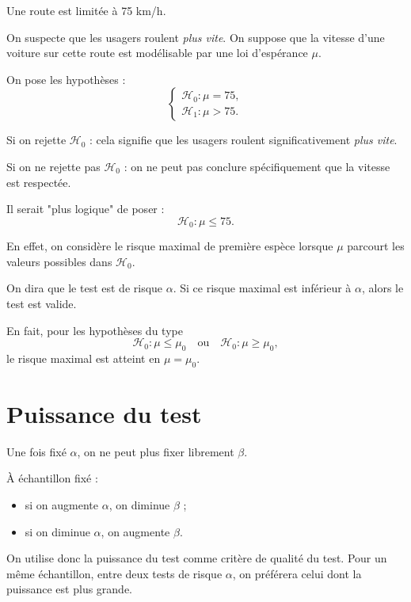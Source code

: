 \begin{exemple}
Une route est limitée à 75 km/h.  

On suspecte que les usagers roulent \textit{plus vite}.  
On suppose que la vitesse d'une voiture sur cette route est modélisable par une loi d'espérance $\mu$.

On pose les hypothèses :
\[
\begin{cases}
\mathcal{H}_0 : \mu = 75, \\
\mathcal{H}_1 : \mu > 75.
\end{cases}
\]

Si on rejette $\mathcal{H}_0$ : cela signifie que les usagers roulent significativement \textit{plus vite}.  

Si on ne rejette pas $\mathcal{H}_0$ : on ne peut pas conclure spécifiquement que la vitesse est respectée.
\end{exemple}

\begin{remarque}
Il serait "plus logique" de poser :
\[
\mathcal{H}_0 : \mu \leq 75.
\]

En effet, on considère le risque maximal de première espèce lorsque $\mu$ parcourt les valeurs possibles dans $\mathcal{H}_0$.  

On dira que le test est de risque $\alpha$.  
Si ce risque maximal est inférieur à $\alpha$, alors le test est valide.  

En fait, pour les hypothèses du type
\[
\mathcal{H}_0 : \mu \leq \mu_0 \quad \text{ou} \quad \mathcal{H}_0 : \mu \geq \mu_0,
\]
le risque maximal est atteint en $\mu = \mu_0$.
\end{remarque}

\section{Puissance du test}

Une fois fixé $\alpha$, on ne peut plus fixer librement $\beta$.  

À échantillon fixé :
  \begin{itemize}
  \item si on augmente $\alpha$, on diminue $\beta$ ;
  \item si on diminue $\alpha$, on augmente $\beta$.
  \end{itemize}

On utilise donc la puissance du test comme critère de qualité du test.  
Pour un même échantillon, entre deux tests de risque $\alpha$, on préférera celui dont la puissance est plus grande.

